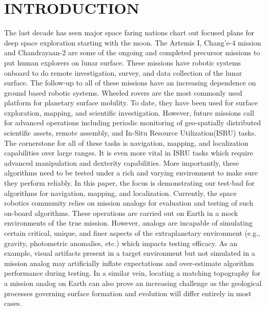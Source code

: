 \documentclass[a4paper, 10pt, conference]{ieeeconf}      %
\begin{document}
\section{INTRODUCTION}

The last decade has seen major space faring nations chart out focused plans for deep space exploration starting with the moon. The Artemis I\cite{sundahl2020setting},  Chang'e-4 mission\cite{jia2018scientific} and Chandrayaan-2\cite{sundararajan2018overview} are some of the ongoing and completed precursor missions to put human explorers on lunar surface. These missions have robotic systems onboard to do remote investigation, survey, and data collection of the lunar surface. The follow-up to all of these missions have an increasing dependence on ground based robotic systems. Wheeled rovers are the most commonly used platform for planetary surface mobility. To date, they have been used for surface exploration, mapping, and scientific investigation. However, future missions call for advanced operations including periodic monitoring of geo-spatially distributed scientific assets, remote assembly, and In-Situ Resource Utilization(ISRU)\cite{green2019situ} tasks. The cornerstone for all of these tasks is navigation, mapping, and localization capabilities over large ranges. It is even more vital in ISRU tasks which require advanced manipulation and dexterity capabilities. More importantly, these algorithms need to be tested under a rich and varying environment to make sure they perform reliably. In this paper, the focus is demonstrating our test-bad for algorithms for navigation, mapping, and localization. Currently, the space robotics community relies on mission analogs for evaluation and testing of such on-board algorithms. These operations are carried out on Earth in a mock environments of the true mission. However, analogs are incapable of simulating certain critical, unique, and finer aspects of the extraplanetary environment (e.g., gravity, photometric anomalies, etc.) which impacts testing efficacy. As an example, visual artifacts present in a target environment but not simulated in a mission analog may artificially inflate expectations and over-estimate algorithm performance during testing. In a similar vein, locating a matching topography for a mission analog on Earth can also prove an increasing challenge as the geological processes governing surface formation and evolution will differ entirely in most cases.    
\end{document}
